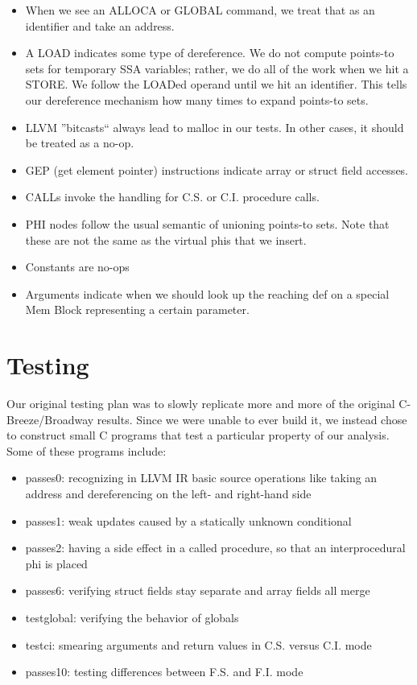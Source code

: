 \begin{itemize}
\item When we see an ALLOCA or GLOBAL command, we treat that as an identifier
      and take an address.
\item A LOAD indicates some type of dereference. We do not compute points-to
      sets for temporary SSA variables; rather, we do all of the work when we
      hit a STORE. We follow the LOADed operand until we hit an identifier. This
      tells our dereference mechanism how many times to expand points-to sets.
\item LLVM ''bitcasts`` always lead to malloc in our tests. In other cases, it
      should be treated as a no-op.
\item GEP (get element pointer) instructions indicate array or struct field
      accesses.
\item CALLs invoke the handling for C.S. or C.I. procedure calls.
\item PHI nodes follow the usual semantic of unioning points-to sets. Note that
      these are not the same as the virtual phis that we insert.
\item Constants are no-ops
\item Arguments indicate when we should look up the reaching def on a special
      Mem Block representing a certain parameter.
\end{itemize}


\section{Testing}

Our original testing plan was to slowly replicate more and more of the original
C-Breeze/Broadway results. Since we were unable to ever build it, we instead
chose to construct small C programs that test a particular property of our
analysis. Some of these programs include:

\begin{itemize}
\item passes0: recognizing in LLVM IR basic source operations like taking an address and
      dereferencing on the left- and right-hand side
\item passes1: weak updates caused by a statically unknown conditional
\item passes2: having a side effect in a called procedure, so that an
      interprocedural phi is placed
\item passes6: verifying struct fields stay separate and array fields all merge
\item testglobal: verifying the behavior of globals
\item testci: smearing arguments and return values in C.S. versus C.I. mode
\item passes10: testing differences between F.S. and F.I. mode
\end{itemize}

